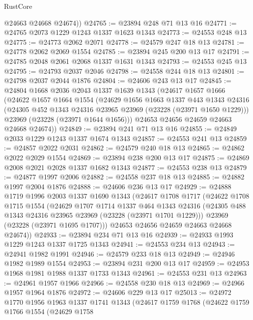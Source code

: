 \begin{lexlean}{RustCore}
\begin{coremodule}
        @24663
        @24668
        @24674))
@24765 := @23894 @248 @71 @13 @16
@24771 := @24765 @2073 @1229 @1243 @1337 @1623 @1343
@24773 := @24553 @248 @13
@24775 := @24773 @2062 @2071
@24778 := @24579 @247 @18 @13
@24781 := @24778 @2062 @2069 @1554
@24785 := @23894 @245 @200 @13 @17
@24791 := @24785 @2048 @2061 @2068 @1337 @1631 @1343
@24793 := @24553 @245 @13
@24795 := @24793 @2037 @2046
@24798 := @24558 @244 @18 @13
@24801 := @24798 @2037 @2044 @1876
@24804 := @24606 @243 @13 @17
@24845 := @24804
    @1668
    @2036
    @2043
    @1337
    @1639
    @1343
    (@24617
      @1657
      @1666
      (@24622
        @1657
        @1664
        @1554
        (@24629
          @1656
          @1663
          @1337
          @443
          @1343
          @24316
          (@24305 @452 @1343 @24316 @23965 @23969 (@23228 (@23971 @1650 @1229)))
          @23969
          (@23228 (@23971 @1644 @1656)))
        @24653
        @24656
        @24659
        @24663
        @24668
        @24674))
@24849 := @23894 @241 @71 @13 @16
@24855 := @24849 @2033 @1229 @1243 @1337 @1674 @1343
@24857 := @24553 @241 @13
@24859 := @24857 @2022 @2031
@24862 := @24579 @240 @18 @13
@24865 := @24862 @2022 @2029 @1554
@24869 := @23894 @238 @200 @13 @17
@24875 := @24869 @2008 @2021 @2028 @1337 @1682 @1343
@24877 := @24553 @238 @13
@24879 := @24877 @1997 @2006
@24882 := @24558 @237 @18 @13
@24885 := @24882 @1997 @2004 @1876
@24888 := @24606 @236 @13 @17
@24929 := @24888
    @1719
    @1996
    @2003
    @1337
    @1690
    @1343
    (@24617
      @1708
      @1717
      (@24622
        @1708
        @1715
        @1554
        (@24629
          @1707
          @1714
          @1337
          @464
          @1343
          @24316
          (@24305 @488 @1343 @24316 @23965 @23969 (@23228 (@23971 @1701 @1229)))
          @23969
          (@23228 (@23971 @1695 @1707)))
        @24653
        @24656
        @24659
        @24663
        @24668
        @24674))
@24933 := @23894 @234 @71 @13 @16
@24939 := @24933 @1993 @1229 @1243 @1337 @1725 @1343
@24941 := @24553 @234 @13
@24943 := @24941 @1982 @1991
@24946 := @24579 @233 @18 @13
@24949 := @24946 @1982 @1989 @1554
@24953 := @23894 @231 @200 @13 @17
@24959 := @24953 @1968 @1981 @1988 @1337 @1733 @1343
@24961 := @24553 @231 @13
@24963 := @24961 @1957 @1966
@24966 := @24558 @230 @18 @13
@24969 := @24966 @1957 @1964 @1876
@24972 := @24606 @229 @13 @17
@25013 := @24972
    @1770
    @1956
    @1963
    @1337
    @1741
    @1343
    (@24617
      @1759
      @1768
      (@24622
        @1759
        @1766
        @1554
        (@24629
          @1758

\end{coremodule}
\end{lexlean}
